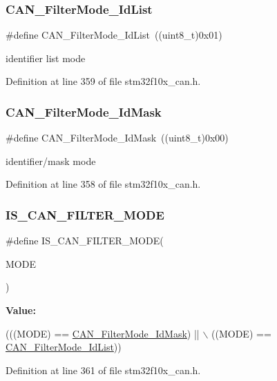 \subsubsection{\texorpdfstring{C\+A\+N\+\_\+\+Filter\+Mode\+\_\+\+Id\+List}{CAN\_FilterMode\_IdList}}
{\footnotesize\ttfamily \#define C\+A\+N\+\_\+\+Filter\+Mode\+\_\+\+Id\+List~((uint8\+\_\+t)0x01)}

identifier list mode 

Definition at line 359 of file stm32f10x\+\_\+can.\+h.

\mbox{\label{group___c_a_n__filter__mode_ga8136e518fb31fd91079e4c7c4c19c94b}} 
\subsubsection{\texorpdfstring{C\+A\+N\+\_\+\+Filter\+Mode\+\_\+\+Id\+Mask}{CAN\_FilterMode\_IdMask}}
{\footnotesize\ttfamily \#define C\+A\+N\+\_\+\+Filter\+Mode\+\_\+\+Id\+Mask~((uint8\+\_\+t)0x00)}

identifier/mask mode 

Definition at line 358 of file stm32f10x\+\_\+can.\+h.

\mbox{\label{group___c_a_n__filter__mode_gae684565d5392c12fd333379e5ec840f8}} 
\subsubsection{\texorpdfstring{I\+S\+\_\+\+C\+A\+N\+\_\+\+F\+I\+L\+T\+E\+R\+\_\+\+M\+O\+DE}{IS\_CAN\_FILTER\_MODE}}
{\footnotesize\ttfamily \#define I\+S\+\_\+\+C\+A\+N\+\_\+\+F\+I\+L\+T\+E\+R\+\_\+\+M\+O\+DE(\begin{DoxyParamCaption}\item[{}]{M\+O\+DE }\end{DoxyParamCaption})}

{\bfseries Value\+:}
\begin{DoxyCode}
(((MODE) == \hyperlink{group___c_a_n__filter__mode_ga8136e518fb31fd91079e4c7c4c19c94b}{CAN\_FilterMode\_IdMask}) || \(\backslash\)
                                  ((MODE) == \hyperlink{group___c_a_n__filter__mode_ga91e9144f71b15ac345ee89314711c158}{CAN\_FilterMode\_IdList}))
\end{DoxyCode}


Definition at line 361 of file stm32f10x\+\_\+can.\+h.

